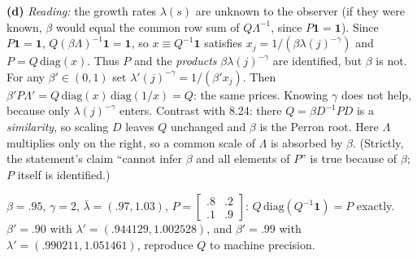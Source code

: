 \documentclass[12pt, letterpaper]{article}
\begin{document}
\begin{tcolorbox}[oddbox,title={Exercise 8.25 \quad Recovering probabilities from prices, II}]
\textbf{(d)} \emph{Reading:} the growth rates $\lambda(s)$ are unknown to the observer (if they were known, $\beta$
would equal the common row sum of $Q\Lambda^{-1}$, since $P\mathbf1=\mathbf1$). Since $P\mathbf 1=\mathbf 1$,
$Q(\beta\Lambda)^{-1}\mathbf 1=\mathbf 1$, so $x\equiv Q^{-1}\mathbf 1$ satisfies $x_j=1/(\beta\lambda(j)^{-\gamma})$ and
$P=Q\,\mathrm{diag}(x)$. Thus $P$ and the \emph{products} $\beta\lambda(j)^{-\gamma}$ are identified, but $\beta$ is not.
For any $\beta'\in(0,1)$ set $\lambda'(j)^{-\gamma}=1/(\beta'x_j)$. Then $\beta'P\Lambda'=Q\,\mathrm{diag}(x)\,\mathrm{diag}(1/x)=Q$:
the same prices. Knowing $\gamma$ does not help, because only $\lambda(j)^{-\gamma}$ enters. Contrast with 8.24: there
$Q=\beta D^{-1}PD$ is a \emph{similarity}, so scaling $D$ leaves $Q$ unchanged and $\beta$ is the Perron root. Here
$\Lambda$ multiplies only on the right, so a common scale of $\Lambda$ is absorbed by $\beta$. (Strictly, the statement's
claim ``cannot infer $\beta$ and all elements of $P$'' is true because of $\beta$; $P$ itself is identified.)

\begin{tcolorbox}[databox]
$\beta=.95$, $\gamma=2$, $\bar\lambda=(.97,1.03)$, $P=\begin{bmatrix}.8&.2\\.1&.9\end{bmatrix}$: $Q\,\mathrm{diag}(Q^{-1}\mathbf1)=P$
exactly. $\beta'=.90$ with $\lambda'=(.944129,1.002528)$, and $\beta'=.99$ with $\lambda'=(.990211,1.051461)$, reproduce $Q$
to machine precision.
\end{tcolorbox}
\end{tcolorbox}
\end{document}
